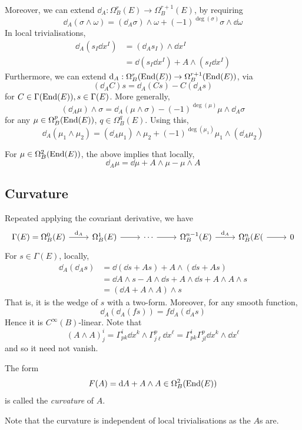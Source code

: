 \documentclass{article}
\begin{document}
Moreover, we can extend \(\dd_A : \Omega_B^r(E) \to \Omega_B^{r+1}(E)\), by requiring
\[\dd_A (\sigma \wedge \omega) = (\dd_A \sigma)\wedge \omega + (-1)^{\deg(\sigma)}\sigma \wedge \dd \omega\]
In local trivialisations,
\begin{align*}
    \dd_A(s_I \dd x^I) &= (\dd_As_I) \wedge \dd x^I \\
    &= \dd(s_I\dd x^I) + A \wedge (s_I \dd x^I)
\end{align*}
Furthermore, we can extend \(\dd_A : \Omega^r_B(\operatorname{End}(E)) \to \Omega^{r+1}_B(\operatorname{End}(E))\), via
\[(\dd_A C)s = \dd_A(Cs) - C(\dd_A s)\]
for \(C \in \Gamma(\operatorname{End}(E)), s \in \Gamma(E)\). More generally,
\[(\dd_A\mu) \wedge \sigma = \dd_A(\mu \wedge \sigma) - (-1)^{\deg(\mu)}\mu \wedge \dd_A\sigma\]
for any \(\mu \in \Omega_B^p(\operatorname{End}(E))\), \(q \in \Omega^q_B(E)\). Using this, 
\[\dd_A(\mu_1 \wedge \mu_2) = (\dd_A\mu_1) \wedge \mu_2 + (-1)^{\deg(\mu_1)}\mu_1 \wedge (\dd_A \mu_2)\]

\begin{example}
    For \(\mu \in \Omega_B^2(\operatorname{End}(E))\), the above implies that locally,
    \[\dd_A\mu = \dd\mu + A \wedge \mu - \mu \wedge A\]
\end{example}

\subsection{Curvature}

Repeated applying the covariant derivative, we have
\[\begin{tikzcd}
	{\Gamma(E) = \Omega^0_B(E)} & {\Omega^1_B(E)} & \cdots & {\Omega_B^{n-1}(E)} & {\Omega_B^n(E(} & 0
	\arrow["{\dd_A}", from=1-1, to=1-2]
	\arrow[from=1-2, to=1-3]
	\arrow[from=1-3, to=1-4]
	\arrow["{\dd_A}", from=1-4, to=1-5]
	\arrow[from=1-5, to=1-6]
\end{tikzcd}\]
For \(s \in \Gamma(E)\), locally,
\begin{align*}
    \dd_A(\dd_A s) &= \dd(\dd s + As) + A \wedge (\dd s + As) \\
    &= \dd A \wedge s - A \wedge \dd s + A \wedge \dd s + A \wedge A \wedge s \\
    &= (\dd A + A \wedge A) \wedge s
\end{align*}
That is, it is the wedge of \(s\) with a two-form. Moreover, for any smooth function,
\[\dd_A(\dd_A(fs)) = f\dd_A(\dd_As)\]
Hence it is \(C^\infty(B)\)-linear. Note that
\[(A \wedge A)^i_j = \Gamma^i_{pk}\dd x^k \wedge \Gamma^{p}_{j\ell}\dd x^\ell = \Gamma^i_{pk}\Gamma^p_{jl}\dd x^k \wedge \dd x^\ell\]
and so it need not vanish.
\begin{definition}
    [curvature] The form
    \[F(A) = \dd A + A \wedge A \in \Omega^2_B(\operatorname{End}(E))\]
    is called the \emph{curvature} of \(A\).
\end{definition}
Note that the curvature is independent of local trivialisations as the \(A\)s are.
\end{document}
